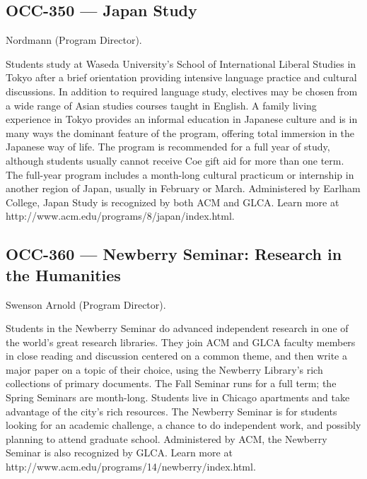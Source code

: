\documentclass[
  letterpaper,
]{scrbook}
\begin{document}
\hypertarget{occ-350-japan-study}{%
\subsection{OCC-350 --- Japan Study}\label{occ-350-japan-study}}

Nordmann (Program Director).

Students study at Waseda University's School of International Liberal
Studies in Tokyo after a brief orientation providing intensive language
practice and cultural discussions. In addition to required language
study, electives may be chosen from a wide range of Asian studies
courses taught in English. A family living experience in Tokyo provides
an informal education in Japanese culture and is in many ways the
dominant feature of the program, offering total immersion in the
Japanese way of life. The program is recommended for a full year of
study, although students usually cannot receive Coe gift aid for more
than one term. The full-year program includes a month-long cultural
practicum or internship in another region of Japan, usually in February
or March. Administered by Earlham College, Japan Study is recognized by
both ACM and GLCA. Learn more at
http://www.acm.edu/programs/8/japan/index.html.

\hypertarget{occ-360-newberry-seminar-research-in-the-humanities}{%
\subsection{OCC-360 --- Newberry Seminar: Research in the
Humanities}\label{occ-360-newberry-seminar-research-in-the-humanities}}

Swenson Arnold (Program Director).

Students in the Newberry Seminar do advanced independent research in one
of the world's great research libraries. They join ACM and GLCA faculty
members in close reading and discussion centered on a common theme, and
then write a major paper on a topic of their choice, using the Newberry
Library's rich collections of primary documents. The Fall Seminar runs
for a full term; the Spring Seminars are month-long. Students live in
Chicago apartments and take advantage of the city's rich resources. The
Newberry Seminar is for students looking for an academic challenge, a
chance to do independent work, and possibly planning to attend graduate
school. Administered by ACM, the Newberry Seminar is also recognized by
GLCA. Learn more at http://www.acm.edu/programs/14/newberry/index.html.
\end{document}
